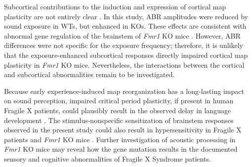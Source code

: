Subcortical contributions to the induction and expression of cortical map plasticity are not entirely clear \cite{Barkat2011, Oliver2011, Miyakawa2013}. In this study, ABR amplitudes were reduced by sound exposure in WTs, but enhanced in KOs. These effects are consistent with abnormal gene regulation of the brainstem of \textit{Fmr1} KO mice \cite{Strumbos2010}. However, ABR differences were not specific for the exposure frequency; therefore, it is unlikely that the exposure-enhanced subcortical responses directly impaired cortical map plasticity in \textit{Fmr1} KO mice. Nevertheless, the interactions between the cortical and subcortical abnormalities remain to be investigated.

Because early experience-induced map reorganization has a long-lasting impact on sound perception, impaired critical period plasticity, if present in human Fragile X patients, could plausibly result in the observed delay in language development \cite{Finestack2009}. The stimulus-nonspecific sensitization of brainstem responses observed in the present study could also result in hypersensitivity in Fragile X patients and \textit{Fmr1} KO mice \cite{Miller1999, Chen2001, Nielsen2002, Tsiouris2004}. Further investigation of acoustic processing in \textit{Fmr1} KO mice may reveal how the gene mutation results in the documented sensory and cognitive abnormalities of Fragile X Syndrome patients.

\printbibliography
